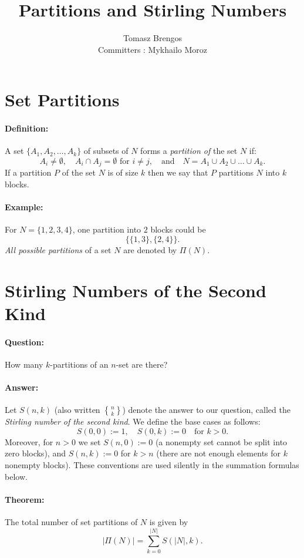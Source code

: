 \documentclass[docmute]{article}
\title{Partitions and Stirling Numbers}
\author{Tomasz Brengos \\  
Committers : Mykhailo Moroz}
\date{}
\begin{document}
\maketitle

\section{Set Partitions}  
\paragraph{Definition:}  
A set \( \{ A_1, A_2, \dots, A_k \} \) of subsets of \( N \) forms a \emph{partition of} the set \( N \) if:
\[
A_i \neq \emptyset, \quad A_i \cap A_j = \emptyset \text{ for } i \neq j, \quad \text{and} \quad N = A_1 \cup A_2 \cup \dots \cup A_k.
\]
If a partition \( P \) of the set \( N \) is of size \( k \) then we say that \( P \) partitions \( N \) into \( k \) blocks. 
\paragraph{Example:}  
For \( N = \{1,2,3,4\} \), one partition into \( 2 \) blocks could be  
\[
\{\{1,3\}, \{2,4\}\}.
\]  
\emph{All possible partitions} of a set \( N \) are denoted by \( \Pi(N) \).

\section{Stirling Numbers of the Second Kind}
 \paragraph{Question:}  
How many \( k \)-partitions of an \( n \)-set are there?  
\paragraph{Answer:}  
Let \( S(n, k) \) (also written \( \genfrac\{\}{0pt}{}{n}{k} \)) denote the answer to our question, called the \emph{Stirling number of the second kind}.
We define the base cases as follows:
\[
S(0,0) := 1, \quad S(0,k) := 0 \quad \text{for } k > 0.
\]
Moreover, for \(n > 0\) we set \(S(n,0) := 0\) (a nonempty set cannot be split into zero blocks), and \(S(n,k) := 0\) for \(k > n\) (there are not enough elements for \(k\) nonempty blocks). These conventions are used silently in the summation formulas below.
\paragraph{Theorem:}  
The total number of set partitions of \( N \) is given by  
\[
|\Pi(N)| = \sum_{k=0}^{|N|} S(|N|, k).
\]  
\end{document}
